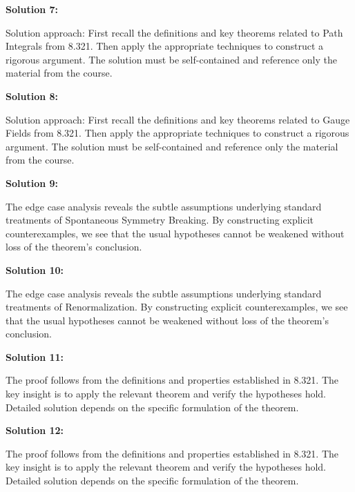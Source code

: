 \documentclass[12pt,a4paper]{exam}
\begin{document}
\vspace{0.5cm}

\textbf{Solution 7:}

Solution approach: First recall the definitions and key theorems related to Path Integrals from 8.321. Then apply the appropriate techniques to construct a rigorous argument. The solution must be self-contained and reference only the material from the course.

\vspace{0.5cm}

\textbf{Solution 8:}

Solution approach: First recall the definitions and key theorems related to Gauge Fields from 8.321. Then apply the appropriate techniques to construct a rigorous argument. The solution must be self-contained and reference only the material from the course.

\vspace{0.5cm}

\textbf{Solution 9:}

The edge case analysis reveals the subtle assumptions underlying standard treatments of Spontaneous Symmetry Breaking. By constructing explicit counterexamples, we see that the usual hypotheses cannot be weakened without loss of the theorem's conclusion.

\vspace{0.5cm}

\textbf{Solution 10:}

The edge case analysis reveals the subtle assumptions underlying standard treatments of Renormalization. By constructing explicit counterexamples, we see that the usual hypotheses cannot be weakened without loss of the theorem's conclusion.

\vspace{0.5cm}

\textbf{Solution 11:}

The proof follows from the definitions and properties established in 8.321. The key insight is to apply the relevant theorem and verify the hypotheses hold. Detailed solution depends on the specific formulation of the theorem.

\vspace{0.5cm}

\textbf{Solution 12:}

The proof follows from the definitions and properties established in 8.321. The key insight is to apply the relevant theorem and verify the hypotheses hold. Detailed solution depends on the specific formulation of the theorem.
\end{document}
